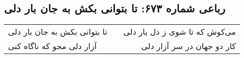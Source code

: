 \begin{center}
\section*{رباعی شماره ۶۷۳: تا بتوانی بکش به جان بار دلی}
\label{sec:sh673}
\begin{longtable}{l p{0.5cm} r}
تا بتوانی بکش به جان بار دلی
&&
می‌کوش که تا شوی ز دل یار دلی
\\
آزار دلی مجو که ناگاه کنی
&&
کار دو جهان در سر آزار دلی
\\
\end{longtable}
\end{center}
